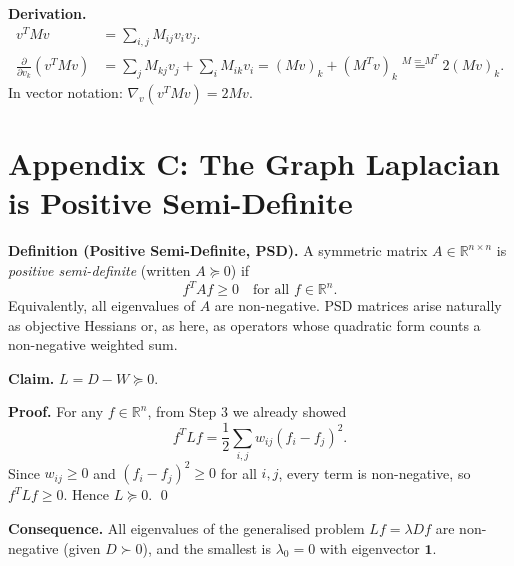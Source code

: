 \documentclass[11pt]{article}
\begin{document}
\textbf{Derivation.}
\begin{align*}
  v^T M v &= \sum_{i,j} M_{ij} v_i v_j.\\
  \frac{\partial}{\partial v_k}(v^T M v)
    &= \sum_j M_{kj} v_j + \sum_i M_{ik} v_i
     = (Mv)_k + (M^T v)_k
     \overset{M=M^T}{=} 2(Mv)_k.
\end{align*}
In vector notation: $\nabla_v (v^T M v) = 2Mv$.

\section*{Appendix C: The Graph Laplacian is Positive Semi-Definite}

\textbf{Definition (Positive Semi-Definite, PSD).}
A symmetric matrix $A \in \mathbb{R}^{n\times n}$ is \emph{positive
semi-definite} (written $A \succeq 0$) if
\[
  f^T A f \ge 0 \quad \text{for all } f \in \mathbb{R}^n.
\]
Equivalently, all eigenvalues of $A$ are non-negative.  PSD matrices
arise naturally as objective Hessians or, as here, as operators whose
quadratic form counts a non-negative weighted sum.

\textbf{Claim.} $L = D - W \succeq 0$.

\textbf{Proof.}
For any $f \in \mathbb{R}^n$, from Step 3 we already showed
\[
  f^T L f = \frac{1}{2}\sum_{i,j} w_{ij}(f_i - f_j)^2.
\]
Since $w_{ij} \ge 0$ and $(f_i - f_j)^2 \ge 0$ for all $i,j$, every
term is non-negative, so $f^T L f \ge 0$.  Hence $L \succeq 0$. \qed

\textbf{Consequence.}
All eigenvalues of the generalised problem $Lf = \lambda Df$ are
non-negative (given $D \succ 0$), and the smallest is $\lambda_0 = 0$
with eigenvector $\mathbf{1}$.
\end{document}
